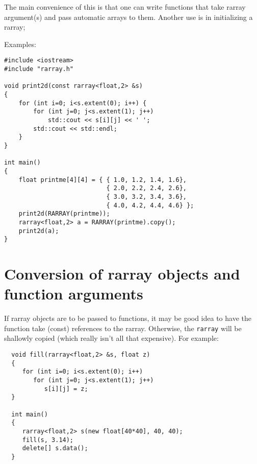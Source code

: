 \documentclass[12pt,twoside]{article}
\begin{document}
The main convenience of this is that one can write functions that take rarray argument(s) and pass automatic arrays to them. Another use is in initializing a rarray;

Examples:
\vspace{-5pt}\begin{framed}\vspace{-14pt}%
\begin{verbatim}
#include <iostream>
#include "rarray.h"

void print2d(const rarray<float,2> &s) 
{
    for (int i=0; i<s.extent(0); i++) {
        for (int j=0; j<s.extent(1); j++)
            std::cout << s[i][j] << ' ';
        std::cout << std::endl;
    }
}

int main() 
{
    float printme[4][4] = { { 1.0, 1.2, 1.4, 1.6},
                            { 2.0, 2.2, 2.4, 2.6},
                            { 3.0, 3.2, 3.4, 3.6},
                            { 4.0, 4.2, 4.4, 4.6} };
    print2d(RARRAY(printme));
    rarray<float,2> a = RARRAY(printme).copy();
    print2d(a);
}
\end{verbatim}
\vspace{-14pt}\end{framed}\vspace{-8pt}



\section{Conversion of rarray objects and function arguments}

If rarray objects are to be passed to functions, it may be good idea to have the function take (const) references to the rarray. Otherwise, the \texttt{rarray} will be shallowly copied (which really isn't all that expensive).  For example:
\vspace{-5pt}\begin{framed}\vspace{-14pt}%
\begin{verbatim}
  void fill(rarray<float,2> &s, float z) 
  {
     for (int i=0; i<s.extent(0); i++)
        for (int j=0; j<s.extent(1); j++)
           s[i][j] = z;
  }

  int main() 
  {
     rarray<float,2> s(new float[40*40], 40, 40);
     fill(s, 3.14);
     delete[] s.data();
  }
\end{verbatim}
\vspace{-14pt}\end{framed}\vspace{-8pt}
\end{document}
